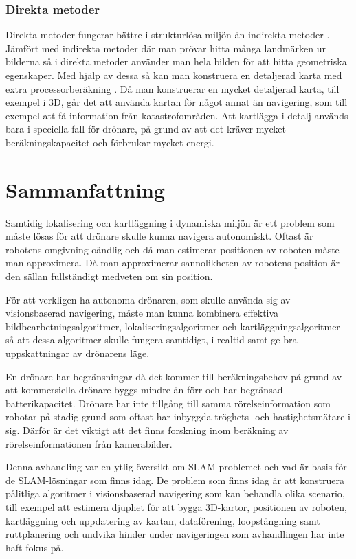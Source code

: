 \subsection{Direkta metoder}

Direkta metoder fungerar bättre i strukturlösa miljön än indirekta metoder \citep{Engel2014LSDSLAMLD}. Jämfört med indirekta metoder där man prövar hitta många landmärken ur bilderna så i direkta metoder använder man hela bilden för att hitta geometriska egenskaper. Med hjälp av dessa så kan man konstruera en detaljerad karta med extra processorberäkning \citep{geospatial}. Då man konstruerar en mycket detaljerad karta, till exempel i 3D, går det att använda kartan för något annat än navigering, som till exempel att få information från katastrofområden. Att kartlägga i detalj används bara i speciella fall för drönare, på grund av att det kräver mycket beräkningskapacitet och förbrukar mycket energi.

\chapter{Sammanfattning}

Samtidig lokalisering och kartläggning i dynamiska miljön är ett problem som måste lösas för att drönare skulle kunna navigera autonomiskt. Oftast är robotens omgivning oändlig och då man estimerar positionen av roboten måste man approximera. Då man approximerar sannolikheten av robotens position är den sällan fullständigt medveten om sin position. 

För att verkligen ha autonoma drönaren, som skulle använda sig av visionsbaserad navigering, måste man kunna kombinera effektiva bildbearbetningsalgoritmer, lokaliseringsalgoritmer och kartläggningsalgoritmer så att dessa algoritmer skulle fungera samtidigt, i realtid samt ge bra uppskattningar av drönarens läge. 

En drönare har begränsningar då det kommer till beräkningsbehov på grund av att kommersiella drönare byggs mindre än förr och har begränsad batterikapacitet. Drönare har inte tillgång till samma rörelseinformation som robotar på stadig grund som oftast har inbyggda tröghets- och hastighetsmätare i sig. Därför är det viktigt att det finns forskning inom beräkning av rörelseinformationen från kamerabilder. 

Denna avhandling var en ytlig översikt om SLAM problemet och vad är basis för de SLAM-lösningar som finns idag. De problem som finns idag är att konstruera pålitliga algoritmer i visionsbaserad navigering som kan behandla olika scenario, till exempel att estimera djuphet för att bygga 3D-kartor, positionen av roboten, kartläggning och uppdatering av kartan, dataförening, loopstängning samt ruttplanering och undvika hinder under navigeringen som avhandlingen har inte haft fokus på.

